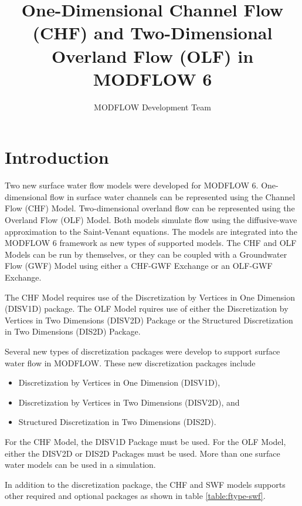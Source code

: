 \documentclass[fleqn]{article}
\author{MODFLOW Development Team}
\begin{document}
\title{One-Dimensional Channel Flow (CHF) and Two-Dimensional Overland Flow (OLF) in MODFLOW 6}
\maketitle

\tableofcontents

\section{Introduction}
Two new surface water flow models were developed for MODFLOW 6.  One-dimensional flow in surface water channels can be represented using the Channel Flow (CHF) Model.  Two-dimensional overland flow can be represented using the Overland Flow (OLF) Model.  Both models simulate flow using the diffusive-wave approximation to the Saint-Venant equations.  The models are integrated into the MODFLOW 6 framework as new types of supported models. The CHF and OLF Models can be run by themselves, or they can be coupled with a Groundwater Flow (GWF) Model using either a CHF-GWF Exchange or an OLF-GWF Exchange.

The CHF Model requires use of the Discretization by Vertices in One Dimension (DISV1D) package.  The OLF Model rquires use of either the Discretization by Vertices in Two Dimensions (DISV2D) Package or the Structured Discretization in Two Dimensions (DIS2D) Package.

Several new types of discretization packages were develop to support surface water flow in MODFLOW.  These new discretization packages include 

\begin{itemize}
  \item Discretization by Vertices in One Dimension (DISV1D), 
  \item Discretization by Vertices in Two Dimensions (DISV2D), and
  \item Structured Discretization in Two Dimensions (DIS2D).
\end{itemize}

\noindent For the CHF Model, the DISV1D Package must be used.  For the OLF Model, either the DISV2D or DIS2D Packages must be used.  More than one surface water models can be used in a simulation.

In addition to the discretization package, the CHF and SWF models supports other required and optional packages as shown in table \ref{table:ftype-swf}.
\end{document}
